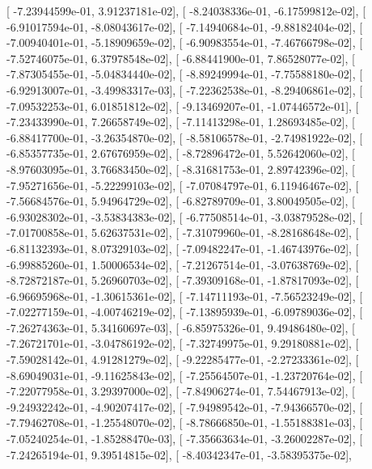 \documentclass{article}
\begin{document}
       [ -7.23944599e-01,   3.91237181e-02],
       [ -8.24038336e-01,  -6.17599812e-02],
       [ -6.91017594e-01,  -8.08043617e-02],
       [ -7.14940684e-01,  -9.88182404e-02],
       [ -7.00940401e-01,  -5.18909659e-02],
       [ -6.90983554e-01,  -7.46766798e-02],
       [ -7.52746075e-01,   6.37978548e-02],
       [ -6.88441900e-01,   7.86528077e-02],
       [ -7.87305455e-01,  -5.04834440e-02],
       [ -8.89249994e-01,  -7.75588180e-02],
       [ -6.92913007e-01,  -3.49983317e-03],
       [ -7.22362538e-01,  -8.29406861e-02],
       [ -7.09532253e-01,   6.01851812e-02],
       [ -9.13469207e-01,  -1.07446572e-01],
       [ -7.23433990e-01,   7.26658749e-02],
       [ -7.11413298e-01,   1.28693485e-02],
       [ -6.88417700e-01,  -3.26354870e-02],
       [ -8.58106578e-01,  -2.74981922e-02],
       [ -6.85357735e-01,   2.67676959e-02],
       [ -8.72896472e-01,   5.52642060e-02],
       [ -8.97603095e-01,   3.76683450e-02],
       [ -8.31681753e-01,   2.89742396e-02],
       [ -7.95271656e-01,  -5.22299103e-02],
       [ -7.07084797e-01,   6.11946467e-02],
       [ -7.56684576e-01,   5.94964729e-02],
       [ -6.82789709e-01,   3.80049505e-02],
       [ -6.93028302e-01,  -3.53834383e-02],
       [ -6.77508514e-01,  -3.03879528e-02],
       [ -7.01700858e-01,   5.62637531e-02],
       [ -7.31079960e-01,  -8.28168648e-02],
       [ -6.81132393e-01,   8.07329103e-02],
       [ -7.09482247e-01,  -1.46743976e-02],
       [ -6.99885260e-01,   1.50006534e-02],
       [ -7.21267514e-01,  -3.07638769e-02],
       [ -8.72872187e-01,   5.26960703e-02],
       [ -7.39309168e-01,  -1.87817093e-02],
       [ -6.96695968e-01,  -1.30615361e-02],
       [ -7.14711193e-01,  -7.56523249e-02],
       [ -7.02277159e-01,  -4.00746219e-02],
       [ -7.13895939e-01,  -6.09789036e-02],
       [ -7.26274363e-01,   5.34160697e-03],
       [ -6.85975326e-01,   9.49486480e-02],
       [ -7.26721701e-01,  -3.04786192e-02],
       [ -7.32749975e-01,   9.29180881e-02],
       [ -7.59028142e-01,   4.91281279e-02],
       [ -9.22285477e-01,  -2.27233361e-02],
       [ -8.69049031e-01,  -9.11625843e-02],
       [ -7.25564507e-01,  -1.23720764e-02],
       [ -7.22077958e-01,   3.29397000e-02],
       [ -7.84906274e-01,   7.54467913e-02],
       [ -9.24932242e-01,  -4.90207417e-02],
       [ -7.94989542e-01,  -7.94366570e-02],
       [ -7.79462708e-01,  -1.25548070e-02],
       [ -8.78666850e-01,  -1.55188381e-03],
       [ -7.05240254e-01,  -1.85288470e-03],
       [ -7.35663634e-01,  -3.26002287e-02],
       [ -7.24265194e-01,   9.39514815e-02],
       [ -8.40342347e-01,  -3.58395375e-02],
\end{document}
